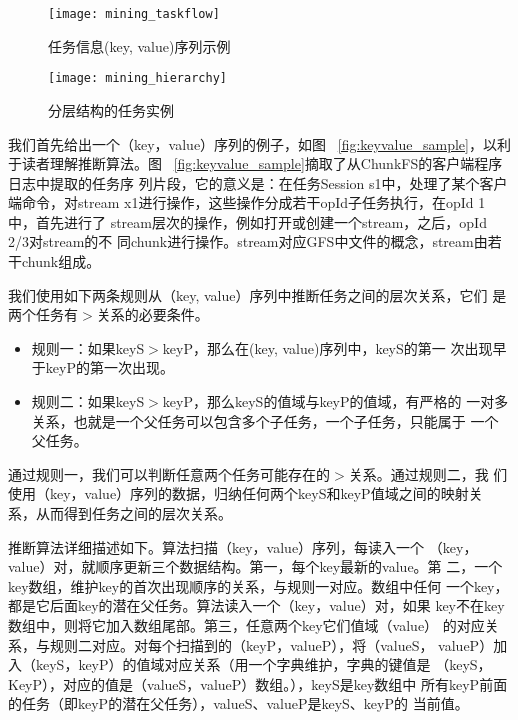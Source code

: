 

\begin{figure}[htbp]
  \centering
  \begin{minipage}{0.4\linewidth}
    \centering
    \texttt{[image: mining\_taskflow]}
    \caption{任务信息(key, value)序列示例}
    \label{fig:keyvalue_sample}
  \end{minipage}
  \qquad
  \begin{minipage}{0.4\linewidth}
    \centering
    \texttt{[image: mining\_hierarchy]}
    \caption{分层结构的任务实例}
    \label{fig:taskhierarchy_sample}
  \end{minipage}
\end{figure}

我们首先给出一个（key，value）序列的例子，如图~
\ref{fig:keyvalue_sample}，以利于读者理解推断算法。图~
\ref{fig:keyvalue_sample}摘取了从ChunkFS的客户端程序日志中提取的任务序
列片段，它的意义是：在任务Session s1中，处理了某个客户端命令，对stream
x1进行操作，这些操作分成若干opId子任务执行，在opId 1中，首先进行了
stream层次的操作，例如打开或创建一个stream，之后，opId 2/3对stream的不
同chunk进行操作。stream对应GFS中文件的概念，stream由若干chunk组成。


我们使用如下两条规则从（key, value）序列中推断任务之间的层次关系，它们
是两个任务有$>$关系的必要条件。

\begin{itemize}

  \item 规则一：如果keyS$>$keyP，那么在(key, value)序列中，keyS的第一
  次出现早于keyP的第一次出现。

  \item 规则二：如果keyS$>$keyP，那么keyS的值域与keyP的值域，有严格的
  一对多关系，也就是一个父任务可以包含多个子任务，一个子任务，只能属于
  一个父任务。

\end{itemize}

通过规则一，我们可以判断任意两个任务可能存在的$>$关系。通过规则二，我
们使用（key，value）序列的数据，归纳任何两个keyS和keyP值域之间的映射关
系，从而得到任务之间的层次关系。

推断算法详细描述如下。算法扫描（key，value）序列，每读入一个
（key，value）对，就顺序更新三个数据结构。第一，每个key最新的value。第
二，一个key数组，维护key的首次出现顺序的关系，与规则一对应。数组中任何
一个key，都是它后面key的潜在父任务。算法读入一个（key，value）对，如果
key不在key数组中，则将它加入数组尾部。第三，任意两个key它们值域（value）
的对应关系，与规则二对应。对每个扫描到的（keyP，valueP），将（valueS，
valueP）加入（keyS，keyP）的值域对应关系（用一个字典维护，字典的键值是
（keyS，KeyP），对应的值是（valueS，valueP）数组。），keyS是key数组中
所有keyP前面的任务（即keyP的潜在父任务），valueS、valueP是keyS、keyP的
当前值。

